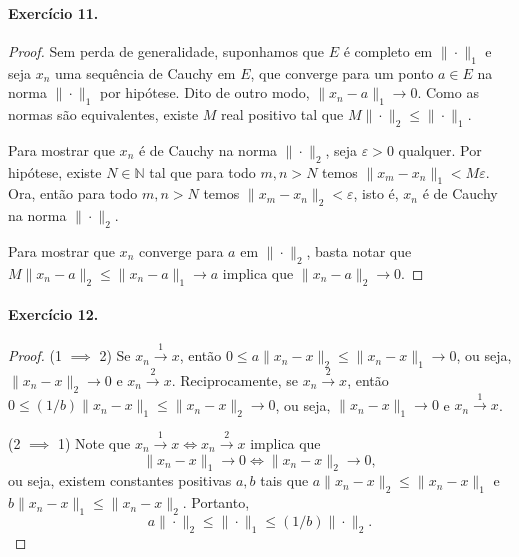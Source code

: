 \documentclass[12pt,a4paper]{article}
\begin{document}
\paragraph{Exercício 11.}
\begin{proof}
Sem perda de generalidade, suponhamos que $E$ é completo em $\|\cdot \|_1$ e seja $x_n$ uma sequência de Cauchy em $E$, 
que converge para um ponto $a\in E$ na norma $\|\cdot \|_1$ por hipótese. Dito de outro modo, $\|x_n-a\|_1 \to 0$. 
Como as normas são equivalentes, existe $M$ real positivo tal que $M\|\cdot\|_2 \leq \|\cdot\|_1$.

Para mostrar que $x_n$ é de Cauchy na norma $\|\cdot\|_2$, seja $\varepsilon > 0$ qualquer. Por hipótese, existe
$N\in\mathbb{N}$ tal que para todo $m,n > N$ temos $\|x_m - x_n\|_1 < M\varepsilon$. Ora, então para todo $m,n > N$
temos $\|x_m - x_n\|_2 < \varepsilon$, isto é, $x_n$ é de Cauchy na norma $\|\cdot\|_2$.

Para mostrar que $x_n$ converge para $a$ em $\|\cdot\|_2$, basta notar que $M\|x_n - a\|_2 \leq \|x_n - a\|_1 \to a$ 
implica que $\|x_n - a\|_2 \to 0$. 
\end{proof}

\paragraph{Exercício 12.}
\begin{proof}
(1 $\implies$ 2) Se $x_n \xrightarrow{1} x$, então $0 \leq a\|x_n - x\|_2 \leq \|x_n - x\|_1 \to 0$, ou seja, $\|x_n - x\|_2 \to 0$ 
e $x_n \xrightarrow{2} x$. Reciprocamente, se $x_n \xrightarrow{2} x$, então $0 \leq (1/b)\|x_n - x\|_1 \leq \|x_n - x\|_2 \to 0$, 
ou seja, $\|x_n - x\|_1 \to 0$ e $x_n \xrightarrow{1} x$.

(2 $\implies$ 1) Note que $x_n \xrightarrow{1} x \iff x_n \xrightarrow{2} x$ implica que
\begin{equation*}
    \|x_n - x\|_1 \to 0 \iff \|x_n - x\|_2 \to 0,
\end{equation*}
ou seja, existem constantes positivas $a,b$ tais que $a\|x_n - x\|_2 \leq \|x_n - x\|_1$ e $b\|x_n - x\|_1 \leq \|x_n - x\|_2$. 
Portanto,
\begin{equation*}
    a\|\cdot \|_2 \leq \|\cdot \|_1 \leq (1/b)\|\cdot \|_2.
\end{equation*}
\end{proof}
\end{document}
